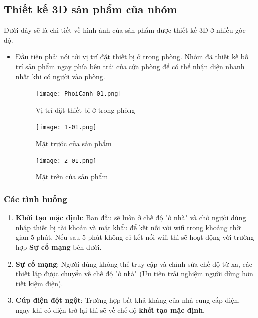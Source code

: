 \documentclass{report}
\begin{document}
\subsection{Thiết kế 3D sản phẩm của nhóm}
Dưới đây sẽ là chi tiết về hình ảnh của sản phẩm được thiết kế 3D ở nhiều góc độ.
\begin{itemize}
    \item Đầu tiên phải nói tới vị trí đặt thiết bị ở trong phòng. Nhóm đã thiết kế bố trí sản phẩm ngay phía bên trái của cửa phòng để có thể nhận diện nhanh nhất khi có người vào phòng.
    \begin{figure}[!h]
        \centering
        \texttt{[image: PhoiCanh-01.png]}
        \caption{Vị trí đặt thiết bị ở trong phòng}
    \end{figure}

    \begin{figure}[!h]
        \centering
        \texttt{[image: 1-01.png]}
        \caption{Mặt trước của sản phẩm}
    \end{figure}

    \begin{figure}[!h]
        \centering
        \texttt{[image: 2-01.png]}
        \caption{Mặt trên của sản phẩm}
    \end{figure}
\end{itemize}

\newpage
\subsubsection{Các tình huống}
\begin{enumerate}
    \item \textbf{Khởi tạo mặc định}: Ban đầu sẽ luôn ở chế độ "ở nhà" và chờ người dùng nhập thiết bị tài khoản và mật khẩu để kết nối với wifi trong khoảng thời gian 5 phút. Nếu sau 5 phút không có kết nối wifi thì sẽ hoạt động với trường hợp \textbf{Sự cố mạng} bên dưới.

    \item \textbf{Sự cố mạng}: Người dùng không thể truy cập và chỉnh sửa chế độ từ xa, các thiết lập được chuyển về chế độ "ở nhà" (Ưu tiên trải nghiệm người dùng hơn tiết kiệm điện). 
    
    \item \textbf{Cúp điện đột ngột}: Trường hợp bất khả kháng của nhà cung cấp điện, ngay khi có điện trở lại thì sẽ về chế độ \textbf{khởi tạo mặc định}.
\end{enumerate}
\pagebreak
\end{document}
